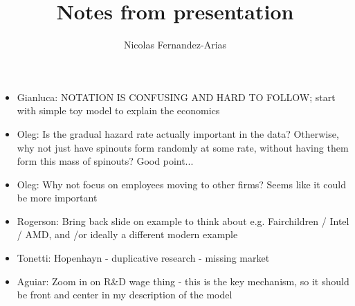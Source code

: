 \documentclass[11pt,english]{article}
\theoremstyle{remark}
\begin{document}
	
\title{Notes from presentation}
\author{Nicolas Fernandez-Arias}
\maketitle

\begin{itemize}
	\item Gianluca: NOTATION IS CONFUSING AND HARD TO FOLLOW; start with simple toy model to explain the economics
	\item Oleg: Is the gradual hazard rate actually important in the data? Otherwise, why not just have spinouts form randomly at some rate, without having them form this mass of spinouts? Good point...
	\item Oleg: Why not focus on employees moving to other firms? Seems like it could be more important
	\item Rogerson: Bring back slide on example to think about e.g. Fairchildren / Intel / AMD, and /or ideally a different modern example
	\item Tonetti: Hopenhayn - duplicative research - missing market
	\item Aguiar: Zoom in on R\&D wage thing - this is the key mechanism, so it should be front and center in my description of the model
\end{itemize}
\end{document}
